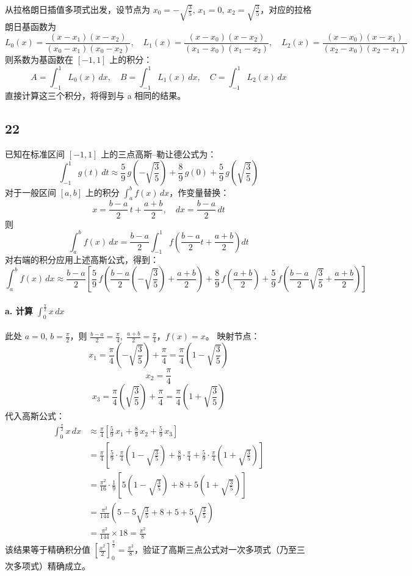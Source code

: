 \documentclass{article}
\begin{document}
从拉格朗日插值多项式出发，设节点为 \(x_0=-\sqrt{\frac{3}{5}},\,x_1=0,\,x_2=\sqrt{\frac{3}{5}}\)，对应的拉格朗日基函数为
\[
L_0(x)=\frac{(x-x_1)(x-x_2)}{(x_0-x_1)(x_0-x_2)},\quad
L_1(x)=\frac{(x-x_0)(x-x_2)}{(x_1-x_0)(x_1-x_2)},\quad
L_2(x)=\frac{(x-x_0)(x-x_1)}{(x_2-x_0)(x_2-x_1)}
\]
则系数为基函数在 \([-1,1]\) 上的积分：
\[
A = \int_{-1}^1 L_0(x)\,dx,\quad
B = \int_{-1}^1 L_1(x)\,dx,\quad
C = \int_{-1}^1 L_2(x)\,dx
\]
直接计算这三个积分，将得到与 a 相同的结果。

\subsection*{22}

已知在标准区间 \([-1,1]\) 上的三点高斯–勒让德公式为：
\[
\int_{-1}^1 g(t)\,dt \approx \frac{5}{9}\,g\!\left(-\sqrt{\frac{3}{5}}\right) + \frac{8}{9}\,g(0) + \frac{5}{9}\,g\!\left(\sqrt{\frac{3}{5}}\right)
\]
对于一般区间 \([a,b]\) 上的积分 \(\int_a^b f(x)\,dx\)，作变量替换：
\[
x = \frac{b-a}{2}\,t + \frac{a+b}{2},\quad dx = \frac{b-a}{2}\,dt
\]
则
\[
\int_a^b f(x)\,dx = \frac{b-a}{2}\int_{-1}^1 f\!\left(\frac{b-a}{2}t + \frac{a+b}{2}\right) dt
\]
对右端的积分应用上述高斯公式，得到：
\[
\boxed{\int_a^b f(x)\,dx \approx \frac{b-a}{2}\left[ \frac{5}{9}\,f\!\left(\frac{b-a}{2}\left(-\sqrt{\frac{3}{5}}\right)+\frac{a+b}{2}\right) + \frac{8}{9}\,f\!\left(\frac{a+b}{2}\right) + \frac{5}{9}\,f\!\left(\frac{b-a}{2}\sqrt{\frac{3}{5}}+\frac{a+b}{2}\right) \right]}
\]

\paragraph{a. 计算 \(\displaystyle\int_0^{\frac{\pi}{2}} x\,dx\)}

此处 \(a=0,\,b=\frac{\pi}{2}\)，则 \(\frac{b-a}{2}=\frac{\pi}{4},\;\frac{a+b}{2}=\frac{\pi}{4}\)，\(f(x)=x\)。  
映射节点：
\[
x_1 = \frac{\pi}{4}\left(-\sqrt{\frac{3}{5}}\right) + \frac{\pi}{4} = \frac{\pi}{4}\left(1-\sqrt{\frac{3}{5}}\right)
\]
\[
x_2 = \frac{\pi}{4}
\]
\[
x_3 = \frac{\pi}{4}\left(\sqrt{\frac{3}{5}}\right) + \frac{\pi}{4} = \frac{\pi}{4}\left(1+\sqrt{\frac{3}{5}}\right)
\]
代入高斯公式：
\[
\begin{aligned}
\int_0^{\frac{\pi}{2}} x\,dx &\approx \frac{\pi}{4}\left[ \frac{5}{9}\,x_1 + \frac{8}{9}\,x_2 + \frac{5}{9}\,x_3 \right] \\
&= \frac{\pi}{4}\left[ \frac{5}{9}\cdot\frac{\pi}{4}\left(1-\sqrt{\frac{3}{5}}\right) + \frac{8}{9}\cdot\frac{\pi}{4} + \frac{5}{9}\cdot\frac{\pi}{4}\left(1+\sqrt{\frac{3}{5}}\right) \right] \\
&= \frac{\pi^2}{16}\cdot\frac{1}{9}\left[ 5\left(1-\sqrt{\frac{3}{5}}\right) + 8 + 5\left(1+\sqrt{\frac{3}{5}}\right) \right] \\
&= \frac{\pi^2}{144}\left(5 - 5\sqrt{\frac{3}{5}} + 8 + 5 + 5\sqrt{\frac{3}{5}}\right) \\
&= \frac{\pi^2}{144}\times 18 = \frac{\pi^2}{8}
\end{aligned}
\]
该结果等于精确积分值 \(\left[\frac{x^2}{2}\right]_0^{\frac{\pi}{2}}=\frac{\pi^2}{8}\)，验证了高斯三点公式对一次多项式（乃至三次多项式）精确成立。
\end{document}
